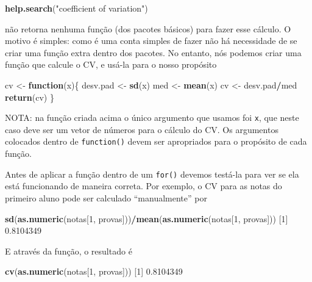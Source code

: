 \documentclass[10pt,a4paper]{book}
\newenvironment{Shaded}{\begin{snugshade}}{\end{snugshade}}
\newcommand{\KeywordTok}[1]{\textcolor[rgb]{0.13,0.29,0.53}{\textbf{#1}}}
\newcommand{\DecValTok}[1]{\textcolor[rgb]{0.00,0.00,0.81}{#1}}
\newcommand{\FloatTok}[1]{\textcolor[rgb]{0.00,0.00,0.81}{#1}}
\newcommand{\StringTok}[1]{\textcolor[rgb]{0.31,0.60,0.02}{#1}}
\newcommand{\ControlFlowTok}[1]{\textcolor[rgb]{0.13,0.29,0.53}{\textbf{#1}}}
\newcommand{\OperatorTok}[1]{\textcolor[rgb]{0.81,0.36,0.00}{\textbf{#1}}}
\newcommand{\NormalTok}[1]{#1}
\begin{document}
\begin{Shaded}
\begin{Highlighting}[]
\KeywordTok{help.search}\NormalTok{(}\StringTok{"coefficient of variation"}\NormalTok{)}
\end{Highlighting}
\end{Shaded}

não retorna nenhuma função (dos pacotes básicos) para fazer esse
cálculo. O motivo é simples: como é uma conta simples de fazer não há
necessidade de se criar uma função extra dentro dos pacotes. No entanto,
nós podemos criar uma função que calcule o CV, e usá-la para o nosso
propósito

\begin{Shaded}
\begin{Highlighting}[]
\NormalTok{cv <-}\StringTok{ }\ControlFlowTok{function}\NormalTok{(x)\{}
\NormalTok{    desv.pad <-}\StringTok{ }\KeywordTok{sd}\NormalTok{(x)}
\NormalTok{    med <-}\StringTok{ }\KeywordTok{mean}\NormalTok{(x)}
\NormalTok{    cv <-}\StringTok{ }\NormalTok{desv.pad}\OperatorTok{/}\NormalTok{med}
    \KeywordTok{return}\NormalTok{(cv)}
\NormalTok{\}}
\end{Highlighting}
\end{Shaded}

NOTA: na função criada acima o único argumento que usamos foi
\texttt{x}, que neste caso deve ser um vetor de números para o cálculo
do CV. Os argumentos colocados dentro de \texttt{function()} devem ser
apropriados para o propósito de cada função.

Antes de aplicar a função dentro de um \texttt{for()} devemos testá-la
para ver se ela está funcionando de maneira correta. Por exemplo, o CV
para as notas do primeiro aluno pode ser calculado ``manualmente'' por

\begin{Shaded}
\begin{Highlighting}[]
\KeywordTok{sd}\NormalTok{(}\KeywordTok{as.numeric}\NormalTok{(notas[}\DecValTok{1}\NormalTok{, provas]))}\OperatorTok{/}\KeywordTok{mean}\NormalTok{(}\KeywordTok{as.numeric}\NormalTok{(notas[}\DecValTok{1}\NormalTok{, provas]))}
\NormalTok{[}\DecValTok{1}\NormalTok{] }\FloatTok{0.8104349}
\end{Highlighting}
\end{Shaded}

E através da função, o resultado é

\begin{Shaded}
\begin{Highlighting}[]
\KeywordTok{cv}\NormalTok{(}\KeywordTok{as.numeric}\NormalTok{(notas[}\DecValTok{1}\NormalTok{, provas]))}
\NormalTok{[}\DecValTok{1}\NormalTok{] }\FloatTok{0.8104349}
\end{Highlighting}
\end{Shaded}
\end{document}
